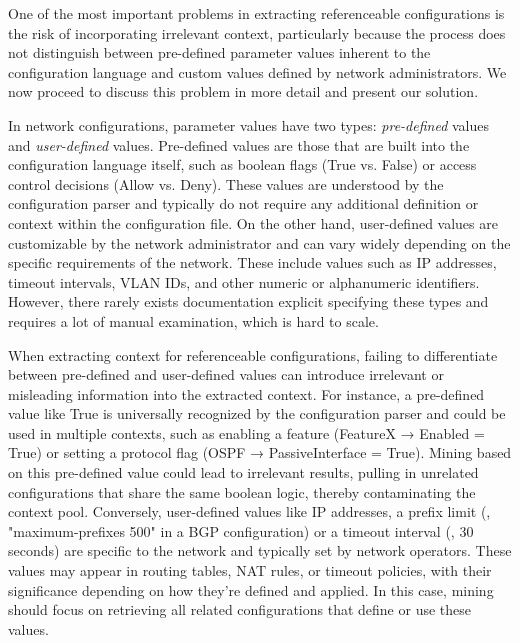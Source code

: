 
One of the most important problems in extracting referenceable configurations
is the risk of incorporating irrelevant context, particularly because the
process does not distinguish between pre-defined parameter values inherent to the configuration language and custom values defined by network administrators. 
We now proceed to discuss this problem in more detail and present our solution.

In network configurations, parameter values have two types: \textit{pre-defined} values and \textit{user-defined} values. Pre-defined values are those that are built into the configuration language itself, such as boolean flags (True vs. False) or access control decisions (Allow vs. Deny). These values are understood by the configuration parser and typically do not require any additional definition or context within the configuration file. On the other hand, user-defined values are customizable by the network administrator and can vary widely depending on the specific requirements of the network. These include values such as IP addresses, timeout intervals, VLAN IDs, and other numeric or alphanumeric identifiers. However, there rarely exists documentation explicit specifying these types and requires a lot of manual examination, which is hard to scale.

When extracting context for referenceable configurations,
failing to differentiate between pre-defined and user-defined values can introduce irrelevant or misleading information into the extracted context.
For instance, a pre-defined value like True is universally recognized by the configuration parser and could be used in multiple contexts, such as enabling a feature (FeatureX → Enabled = True) or setting a protocol flag (OSPF → PassiveInterface = True). Mining based on this pre-defined value could lead to irrelevant results, pulling in unrelated configurations that share the same boolean logic, thereby contaminating the context pool.
Conversely, user-defined values like IP addresses, a prefix limit (\eg, "maximum-prefixes 500" in a BGP configuration) or a timeout interval (\eg, 30 seconds) are specific to the network and typically set by network operators. These values may appear in routing tables, NAT rules, or timeout policies, with their significance depending on how they’re defined and applied. In this case, mining should focus on retrieving all related configurations that define or use these values.

